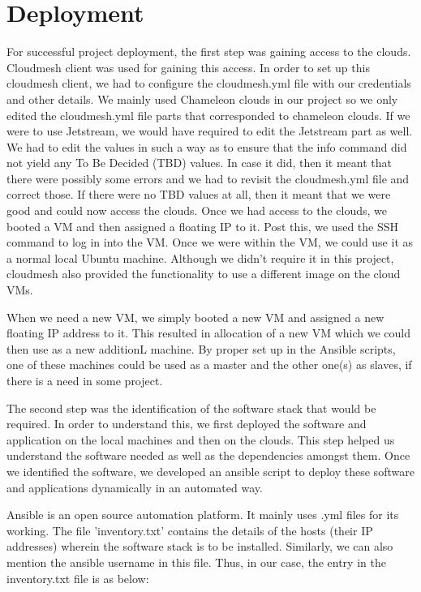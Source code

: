 \documentclass[9pt,twocolumn,twoside]{../../styles/osajnl}
\begin{document}
\section{Deployment}

For successful project deployment, the first step was gaining access
to the clouds.  Cloudmesh client was used for gaining this access.  In
order to set up this cloudmesh client, we had to configure the
cloudmesh.yml file with our credentials and other details.  We mainly
used Chameleon clouds in our project so we only edited the
cloudmesh.yml file parts that corresponded to chameleon clouds.  If we
were to use Jetstream, we would have required to edit the Jetstream
part as well.  We had to edit the values in such a way as to ensure
that the info command did not yield any To Be Decided (TBD) values.
In case it did, then it meant that there were possibly some errors and
we had to revisit the cloudmesh.yml file and correct those.  If there
were no TBD values at all, then it meant that we were good and could
now access the clouds.  Once we had access to the clouds, we booted a
VM and then assigned a floating IP to it.  Post this, we used the SSH
command to log in into the VM.  Once we were within the VM, we could
use it as a normal local Ubuntu machine.  Although we didn't require
it in this project, cloudmesh also provided the functionality to use a
different image on the cloud VMs.

When we need a new VM, we simply booted a new VM and assigned a new
floating IP address to it.  This resulted in allocation of a new VM
which we could then use as a new additionL machine.  By proper set up
in the Ansible scripts, one of these machines could be used as a
master and the other one(s) as slaves, if there is a need in some
project.

The second step was the identification of the software stack that
would be required.  In order to understand this, we first deployed the
software and application on the local machines and then on the
clouds.  This step helped us understand the software needed as well
as the dependencies amongst them.  Once we identified the software,
we developed an ansible script to deploy these software and
applications dynamically in an automated way.

Ansible is an open source automation platform.  It mainly uses .yml
files for its working.  The file 'inventory.txt' contains the details
of the hosts (their IP addresses) wherein the software stack is to be
installed.  Similarly, we can also mention the ansible username in
this file.  Thus, in our case, the entry in the inventory.txt file is
as below:
\end{document}
